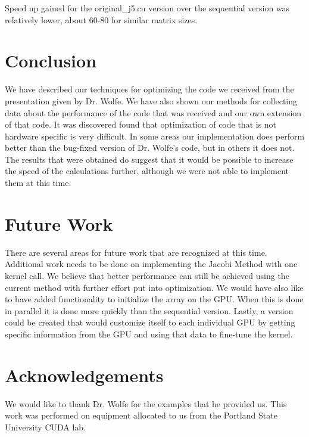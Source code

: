 \documentclass[10pt]{article}
\begin{document}
\begin{multicols}{2}
  Speed up gained for the original\_j5.cu version over the sequential version was relatively lower, about 60-80 for similar matrix sizes.

  \section{Conclusion} %
  \label{sec:conclusion}
  We have described our techniques for optimizing the code we received from the presentation given by Dr. Wolfe.
  We have also shown our methods for collecting data about the performance of the code that was received and our own extension of that code.
  It was discovered found that optimization of code that is not hardware specific is very difficult.
  In some areas our implementation does perform better than the bug-fixed version of Dr. Wolfe's code, but in others it does not.
  The results that were obtained do suggest that it would be possible to increase the speed of the calculations further, although we were not able to implement them at this time.

  \section{Future Work} %
  \label{sec:future_work}
  There are several areas for future work that are recognized at this time.
  Additional work needs to be done on implementing the Jacobi Method with one kernel call.
  We believe that better performance can still be achieved using the current method with further effort put into optimization.
  We would have also like to have added functionality to initialize the array on the GPU.
  When this is done in parallel it is done more quickly than the sequential version.
  Lastly, a version could be created that would customize itself to each individual GPU by getting specific information from the GPU and using that data to fine-tune the kernel.

  \section{Acknowledgements} %
  \label{sec:acknowledgements}
  We would like to thank Dr. Wolfe for the examples that he provided us.
  This work was performed on equipment allocated to us from the Portland State University CUDA lab.

\end{multicols}
\end{document}
